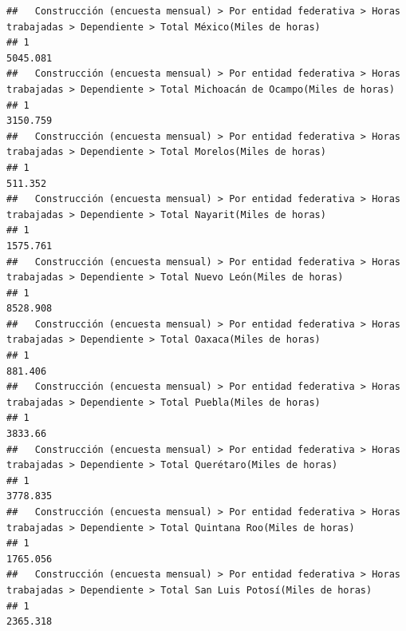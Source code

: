 \documentclass[
]{article}
\begin{document}
\begin{verbatim}
##   Construcción (encuesta mensual) > Por entidad federativa > Horas trabajadas > Dependiente > Total México(Miles de horas) 
## 1                                                                                                                  5045.081
##   Construcción (encuesta mensual) > Por entidad federativa > Horas trabajadas > Dependiente > Total Michoacán de Ocampo(Miles de horas) 
## 1                                                                                                                               3150.759
##   Construcción (encuesta mensual) > Por entidad federativa > Horas trabajadas > Dependiente > Total Morelos(Miles de horas) 
## 1                                                                                                                    511.352
##   Construcción (encuesta mensual) > Por entidad federativa > Horas trabajadas > Dependiente > Total Nayarit(Miles de horas) 
## 1                                                                                                                   1575.761
##   Construcción (encuesta mensual) > Por entidad federativa > Horas trabajadas > Dependiente > Total Nuevo León(Miles de horas) 
## 1                                                                                                                      8528.908
##   Construcción (encuesta mensual) > Por entidad federativa > Horas trabajadas > Dependiente > Total Oaxaca(Miles de horas) 
## 1                                                                                                                   881.406
##   Construcción (encuesta mensual) > Por entidad federativa > Horas trabajadas > Dependiente > Total Puebla(Miles de horas) 
## 1                                                                                                                   3833.66
##   Construcción (encuesta mensual) > Por entidad federativa > Horas trabajadas > Dependiente > Total Querétaro(Miles de horas) 
## 1                                                                                                                     3778.835
##   Construcción (encuesta mensual) > Por entidad federativa > Horas trabajadas > Dependiente > Total Quintana Roo(Miles de horas) 
## 1                                                                                                                        1765.056
##   Construcción (encuesta mensual) > Por entidad federativa > Horas trabajadas > Dependiente > Total San Luis Potosí(Miles de horas) 
## 1                                                                                                                           2365.318

\end{verbatim}
\end{document}
